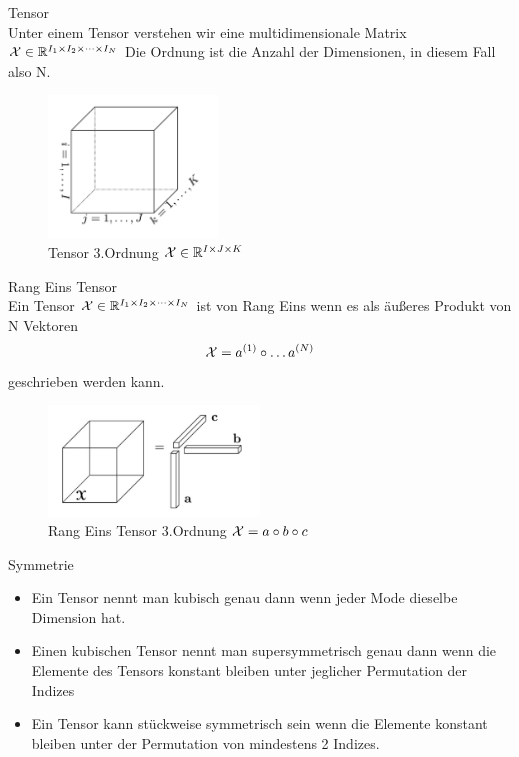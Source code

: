 \begin{Definition} Tensor \\
Unter einem Tensor verstehen wir eine multidimensionale Matrix ${\cal X}  \in \mathbb{R}^{I_1 \times I_2 \times \dots \times I_N}$
Die Ordnung ist die Anzahl der Dimensionen, in diesem Fall also N.
\end{Definition}

\begin{figure}[ht]
	\centering
  \includegraphics[width=0.4\textwidth]{tensorOrdnung3.png}
	\caption{Tensor 3.Ordnung ${\cal X}  \in \mathbb{R}^{I \times J \times K}$}
	\label{fig:tensorOrdnung3}
\end{figure}

\begin{Definition} Rang Eins Tensor \\
Ein Tensor ${\cal X}  \in \mathbb{R}^{I_1 \times I_2 \times \dots \times I_N}$ ist von Rang Eins wenn es als äußeres Produkt von N Vektoren
\begin{equation*}
{\cal{X}} = a^{(1)} \circ \dots a^{(N)}
\end{equation*}
geschrieben werden kann.
\end{Definition}

\begin{figure}[ht]
	\centering
  \includegraphics[width=0.5\textwidth]{rang1Tensor.png}
	\caption{Rang Eins Tensor 3.Ordnung ${\cal X}  = a \circ b \circ c$}
	\label{fig:rang1Tensor}
\end{figure}

\begin{Bemerkung} Symmetrie \\
\begin{itemize}
\item Ein Tensor nennt man kubisch genau dann wenn jeder Mode dieselbe Dimension hat. 
\item Einen kubischen Tensor nennt man supersymmetrisch genau dann wenn die Elemente des Tensors konstant bleiben unter jeglicher Permutation der Indizes
\item Ein Tensor kann stückweise symmetrisch sein wenn die Elemente konstant bleiben unter der Permutation von mindestens 2 Indizes.
\end{itemize}
\end{Bemerkung}

